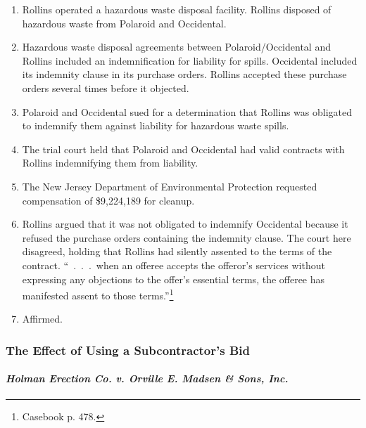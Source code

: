 \begin{enumerate}
    \item Rollins operated a hazardous waste disposal facility. Rollins 
    disposed of hazardous waste from Polaroid and Occidental.
    \item Hazardous waste disposal agreements between Polaroid/Occidental and 
    Rollins included an indemnification for liability for spills. Occidental 
    included its indemnity clause in its purchase orders. Rollins accepted 
    these purchase orders several times before it objected.
    \item Polaroid and Occidental sued for a determination that Rollins was 
    obligated to indemnify them against liability for hazardous waste spills. 
    \item The trial court held that Polaroid and Occidental had valid 
    contracts with Rollins indemnifying them from liability.
    \item The New Jersey Department of Environmental Protection requested 
    compensation of \$9,224,189 for cleanup.
    \item Rollins argued that it was not obligated to indemnify Occidental 
    because it refused the purchase orders containing the indemnity clause. 
    The court here disagreed, holding that Rollins had silently assented to 
    the terms of the contract. ``~.~.~.~when an offeree accepts the offeror's 
    services without expressing any objections to the offer's essential terms, 
    the offeree has manifested assent to those terms.''\footnote{Casebook p. 
    478.}
    \item Affirmed.
\end{enumerate}

\subsubsection{The Effect of Using a Subcontractor's Bid}

\paragraph{\emph{Holman Erection Co. v. Orville E. Madsen \& Sons, Inc.}}

